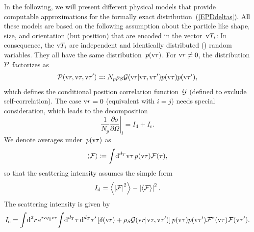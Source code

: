 In the following, we will present different physical models
that provide computable approximations
for the formally exact distribution~(\ref{EPDdeltas}).
All these models are based on the following assumption
about the particle  like shape, size, and orientation
(but  position) that are  encoded in the vector~$\text{v} T_i$:
%
In consequence, the $\text{v} T_i$
are independent and identically distributed () random variables.
They all have the same distribution~$p(\text{v}\tau)$.
For $\text{v}{r}\ne0$, the distribution $\mathcal{P}$ factorizes as
\begin{equation}
  \mathcal{P}(\text{v}{r},\text{v}\tau,\text{v}\tau')\eqqcolon N_p \rho_S \mathcal{G}(\text{v}{r}|\text{v}\tau,\text{v}\tau')p(\text{v}\tau)p(\text{v}\tau'),
\end{equation}
which defines the conditional position correlation function~$\mathcal{G}$ (defined to exclude self-correlation).
The case $\text{v}{r}=0$ (equivalent with $i=j$) needs special consideration,
which leads to the decomposition
\Emph
{\begin{equation}
  \frac{1}{N_p}\left.\frac{\partial\sigma}{\partial\Omega}\right|_l
  = I_\text{d}+I_\text{c}.
\end{equation}\vskip -5pt}
We denote averages under~$p(\text{v}\tau)$ as
\begin{equation}
  \left\langle\mathcal{F}\right\rangle \coloneqq  \int\!\text{d}^{d_T}\text{v}\tau\,p(\text{v}\tau)\mathcal{F}(\tau),
\end{equation}
so that the  scattering intensity assumes the simple form
%
%
\Emph
{\begin{equation}
  I_\text{d} = \left\langle\left|\mathcal{F}\right|^2\right\rangle-\left|\left\langle\mathcal{F}\right\rangle\right|^2.
\end{equation}\vskip -5pt}
The  scattering intensity is given by
\Emph
{\begin{equation}\label{EICoherent}
  I_\text{c} =
  \int\!\text{d}^2r\,   \text{e}^{i\text{v}{q}_{\parallel}\text{v}{r}}\!
  \int\! \text{d}^{d_T}\tau\, \text{d}^{d_T}\tau'
  \left[\delta(\text{v}{r})+\rho_S \mathcal{G}(\text{v}{r}|\text{v}\tau,\text{v}\tau')\right]p(\text{v}\tau)p(\text{v}\tau')
    \mathcal{F}^*(\text{v}\tau) \mathcal{F}(\text{v}\tau').
\end{equation}\vskip -5pt}

